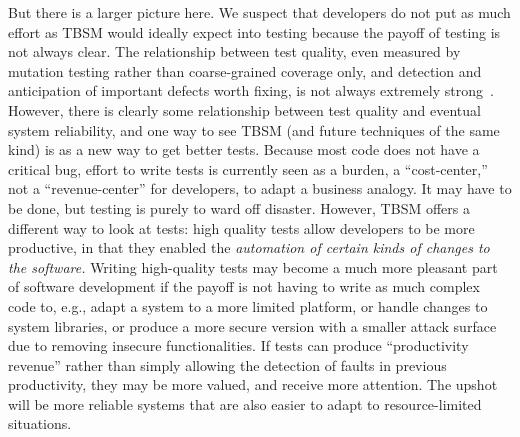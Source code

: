 But there is a larger picture here.  We suspect that developers do not put as much effort as TBSM would ideally expect into testing because the payoff of testing is not always clear.  The relationship between test quality, even measured by mutation testing rather than coarse-grained coverage only, and detection and anticipation of important defects worth fixing, is not always extremely strong~\cite{Testedness}.  However, there is clearly some relationship between test quality and eventual system reliability, and one way to see TBSM (and future techniques of the same kind) is as a new way to get better tests.  Because most code does not have a critical bug, effort to write tests is currently seen as a burden, a ``cost-center,'' not a ``revenue-center'' for developers, to adapt a business analogy.  It may have to be done, but testing is purely to ward off disaster.  However, TBSM offers a different way to look at tests:  high quality tests allow developers to be more productive, in that they enabled the \emph{automation of certain kinds of changes to the software.}  Writing high-quality tests may become a much more pleasant part of software development if the payoff is not having to write as much complex code to, e.g., adapt a system to a more limited platform, or handle changes to system libraries, or produce a more secure version with a smaller attack surface due to removing insecure functionalities.  If tests can produce ``productivity revenue'' rather than simply allowing the detection of faults in previous productivity, they may be more valued, and receive more attention.  The upshot will be more reliable systems that are also easier to adapt to resource-limited situations.